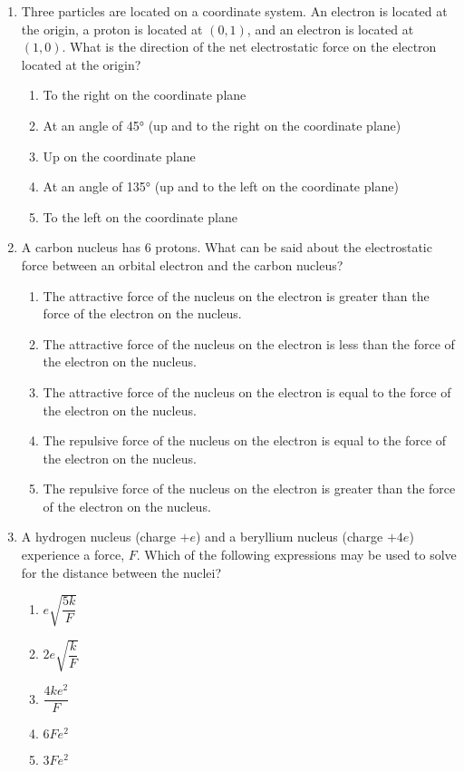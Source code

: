 \documentclass{../../../oss-apphys}
\begin{document}
\begin{multicols*}{2}
\begin{enumerate}[leftmargin=18pt]
   \item Three particles are located on a coordinate system. An electron is
     located at the origin, a proton is located at $(0,1)$, and an electron is
     located at $(1,0)$. What is the direction of the net electrostatic force on
     the electron located at the origin?
     \begin{enumerate}[nosep,leftmargin=18pt,label=(\Alph*)]
     \item To the right on the coordinate plane
     \item At an angle of \ang{45} (up and to the right on the coordinate plane)
     \item Up on the coordinate plane
     \item At an angle of \ang{135} (up and to the left on the coordinate plane)
     \item To the left on the coordinate plane
     \end{enumerate}
     \columnbreak
     
   \item A carbon nucleus has 6 protons. What can be said about the
     electrostatic force between an orbital electron and the carbon nucleus?
     \begin{enumerate}[nosep,leftmargin=18pt,label=(\Alph*)]
     \item The attractive force of the nucleus on the electron is greater than
       the force of the electron on the nucleus.
     \item The attractive force of the nucleus on the electron is less than the
       force of the electron on the nucleus.
     \item The attractive force of the nucleus on the electron is equal to the
       force of the electron on the nucleus.
     \item The repulsive force of the nucleus on the electron is equal to the
       force of the electron on the nucleus.
     \item The repulsive force of the nucleus on the electron is greater than
       the force of the electron on the nucleus.
     \end{enumerate}
     
   \item A hydrogen nucleus (charge $+e$) and a beryllium nucleus (charge $+4e$)
     experience a force, $F$. Which of the following expressions may be used
     to solve for the distance between the nuclei?
     \begin{enumerate}[itemsep=4.5pt,leftmargin=18pt,label=(\Alph*)]
     \item$e\sqrt{\dfrac{5k}F}$
     \item$2e\sqrt{\dfrac{k}F}$
     \item$\dfrac{4ke^2}F$
     \item$6Fe^2$
     \item$3Fe^2$
     \end{enumerate}
     

\end{enumerate}
\end{multicols*}
\end{document}
